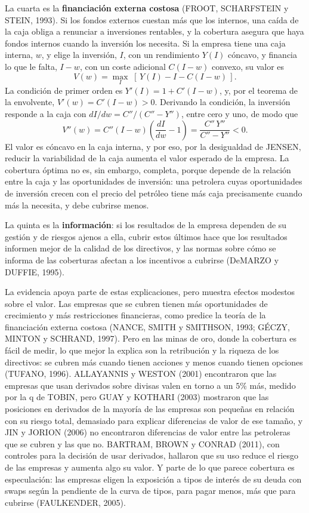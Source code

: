 \documentclass[10pt,a4paper]{article}
\begin{document}
La cuarta es la \textbf{financiación externa costosa} (FROOT, SCHARFSTEIN y STEIN, 1993). Si los fondos externos cuestan más que los internos, una caída de la caja obliga a renunciar a inversiones rentables, y la cobertura asegura que haya fondos internos cuando la inversión los necesita. Si la empresa tiene una caja interna, $w$, y elige la inversión, $I$, con un rendimiento $Y(I)$ cóncavo, y financia lo que le falta, $I-w$, con un coste adicional $C(I-w)$ convexo, su valor es
$$V(w)=\max_{I}\;\left[\,Y(I)-I-C(I-w)\,\right].$$
La condición de primer orden es $Y'(I)=1+C'(I-w)$, y, por el teorema de la envolvente, $V'(w)=C'(I-w)>0$. Derivando la condición, la inversión responde a la caja con $dI/dw=C''/(C''-Y'')$, entre cero y uno, de modo que
$$V''(w)=C''(I-w)\left(\frac{dI}{dw}-1\right)=\frac{C''\,Y''}{C''-Y''}<0.$$
El valor es cóncavo en la caja interna, y por eso, por la desigualdad de JENSEN, reducir la variabilidad de la caja aumenta el valor esperado de la empresa. La cobertura óptima no es, sin embargo, completa, porque depende de la relación entre la caja y las oportunidades de inversión: una petrolera cuyas oportunidades de inversión crecen con el precio del petróleo tiene más caja precisamente cuando más la necesita, y debe cubrirse menos.

La quinta es la \textbf{información}: si los resultados de la empresa dependen de su gestión y de riesgos ajenos a ella, cubrir estos últimos hace que los resultados informen mejor de la calidad de los directivos, y las normas sobre cómo se informa de las coberturas afectan a los incentivos a cubrirse (DeMARZO y DUFFIE, 1995).

La evidencia apoya parte de estas explicaciones, pero muestra efectos modestos sobre el valor. Las empresas que se cubren tienen más oportunidades de crecimiento y más restricciones financieras, como predice la teoría de la financiación externa costosa (NANCE, SMITH y SMITHSON, 1993; GÉCZY, MINTON y SCHRAND, 1997). Pero en las minas de oro, donde la cobertura es fácil de medir, lo que mejor la explica son la retribución y la riqueza de los directivos: se cubren más cuando tienen acciones y menos cuando tienen opciones (TUFANO, 1996). ALLAYANNIS y WESTON (2001) encontraron que las empresas que usan derivados sobre divisas valen en torno a un $5\%$ más, medido por la q de TOBIN, pero GUAY y KOTHARI (2003) mostraron que las posiciones en derivados de la mayoría de las empresas son pequeñas en relación con su riesgo total, demasiado para explicar diferencias de valor de ese tamaño, y JIN y JORION (2006) no encontraron diferencias de valor entre las petroleras que se cubren y las que no. BARTRAM, BROWN y CONRAD (2011), con controles para la decisión de usar derivados, hallaron que su uso reduce el riesgo de las empresas y aumenta algo su valor. Y parte de lo que parece cobertura es especulación: las empresas eligen la exposición a tipos de interés de su deuda con swaps según la pendiente de la curva de tipos, para pagar menos, más que para cubrirse (FAULKENDER, 2005).
\end{document}
